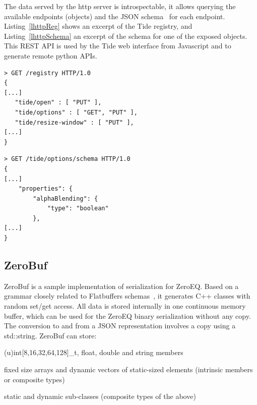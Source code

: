 \documentclass[10pt]{llncs}
\newcommand{\lref}[1]{Listing~\ref{#1}}
\begin{document}
The data served by the http server is introspectable, it allows querying the
available endpoints (objects) and the JSON schema~\cite{jsonschema} for each
endpoint. \lref{lhttpReg} shows an excerpt of the Tide registry, and
\lref{lhttpSchema} an excerpt of the schema for one of the exposed objects. This
REST API is used by the Tide web interface from Javascript and to generate
remote python APIs.

\noindent\begin{minipage}[b][][b]{.48\textwidth}
\begin{lstlisting}[caption=HTTP Server Registry, label=lhttpReg]
> GET /registry HTTP/1.0
{
[...]
   "tide/open" : [ "PUT" ],
   "tide/options" : [ "GET", "PUT" ],
   "tide/resize-window" : [ "PUT" ],
[...]
}
\end{lstlisting}
\end{minipage}\hfill
\begin{minipage}[b][][b]{.48\textwidth}
\begin{lstlisting}[caption=Object JSON Schema, label=lhttpSchema]
> GET /tide/options/schema HTTP/1.0
{
[...]
    "properties": {
        "alphaBlending": {
            "type": "boolean"
        },
[...]
}
\end{lstlisting}
\end{minipage}

\subsection{ZeroBuf}

ZeroBuf is a sample implementation of serialization for ZeroEQ. Based on a
grammar closely related to Flatbuffers schemas~\cite{flatbuffers}, it generates
C++ classes with random \textsf{set/get} access. All data is stored internally
in one continuous memory buffer, which can be used for the ZeroEQ binary
serialization without any copy. The conversion to and from a JSON representation
involves a copy using a \textsf{std::string}. ZeroBuf can store:

\begin{compactitem}
\item (u)int[8,16,32,64,128]\_t, float, double and string members
\item fixed size arrays and dynamic vectors of static-sized elements (intrinsic
members or composite types)
\item static and dynamic sub-classes (composite types of the above)
\end{compactitem}
\end{document}
